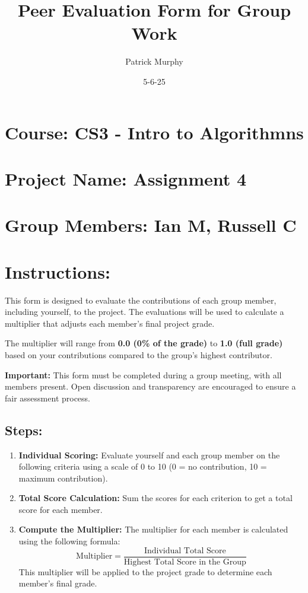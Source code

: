 \documentclass{article}
\title{Peer Evaluation Form for Group Work}
\author{Patrick Murphy}
\date{5-6-25}
\begin{document}
\maketitle

\section*{Course: CS3 - Intro to Algorithmns}
\vspace{0.5cm}

\section*{Project Name: Assignment 4}
\vspace{0.5cm}

\section*{Group Members: Ian M, Russell C}
\vspace{1cm}

\section*{Instructions:}

This form is designed to evaluate the contributions of each group member, including yourself, to the project. The evaluations will be used to calculate a multiplier that adjusts each member's final project grade. 

The multiplier will range from \textbf{0.0 (0\% of the grade)} to \textbf{1.0 (full grade)} based on your contributions compared to the group’s highest contributor.

\textbf{Important:} This form must be completed during a group meeting, with all members present. Open discussion and transparency are encouraged to ensure a fair assessment process.

\subsection*{Steps:}

\begin{enumerate}
    \item \textbf{Individual Scoring:} Evaluate yourself and each group member on the following criteria using a scale of 0 to 10 (0 = no contribution, 10 = maximum contribution).
    \item \textbf{Total Score Calculation:} Sum the scores for each criterion to get a total score for each member.
    \item \textbf{Compute the Multiplier:} The multiplier for each member is calculated using the following formula:
    \[
    \text{Multiplier} = \frac{\text{Individual Total Score}}{\text{Highest Total Score in the Group}}
    \]
    This multiplier will be applied to the project grade to determine each member’s final grade.
\end{enumerate}
\end{document}
